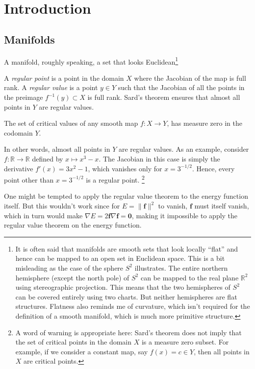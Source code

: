 
\chapter{Introduction}

\section{Manifolds}

A manifold, roughly speaking, a set that looks Euclidean\footnote{It is often said that manifolds are smooth sets that look locally ``flat'' and hence can be mapped to an open set in Euclidean space.
This is a bit misleading as the case of the sphere $S^2$ illustrates.
The entire northern hemisphere (except the north pole) of $S^2$ can be mapped to the real plane $\mathbb{R}^{2}$ using stereographic projection.
This means that the two hemispheres of $S^2$ can be covered entirely using two charts.
But neither hemispheres are flat structures.
Flatness also reminds me of curvature, which isn't required for the definition of a smooth manifold, which is much more primitive structure.}

A \emph{regular point} is a point in the domain $X$ where the Jacobian of the map is full rank.
A \emph{regular value} is a point $y \in Y$ such that the Jacobian of all the points in the preimage $f^{-1}(y) \subset X$ is full rank.
Sard's theorem ensures that almost all points in $Y$ are regular values.
%
\begin{theorem}
  The set of critical values of any smooth map $f: X \to Y$, has measure zero in the codomain $Y$.
\end{theorem}

In other words, almost all points in $Y$ are regular values.
As an example, consider $f: \mathbb{R} \to \mathbb{R}$ defined by $x \mapsto x^3 - x$.
The Jacobian in this case is simply the derivative $f'(x) = 3x^2 - 1$, which vanishes only for $x = 3^{-1/2}$.
Hence, every point other than $x = 3^{-1/2}$ is a regular point.%
\footnote{A word of warning is appropriate here: Sard's theorem does not imply that the set of critical points in the domain $X$ is a measure zero subset.
For example, if we consider a constant map, say $f(x) = c \in Y$, then all points in $X$ are critical points.}

One might be tempted to apply the regular value theorem to the energy function itself.
But this wouldn't work since for $E=\|\bm{f}\|^2$ to vanish, $\bm{f}$ must itself vanish, which in turn would make $\nabla E = 2 \bm{f}\nabla\bm{f} = \bm{0}$, making it impossible to apply the regular value theorem on the energy function.

